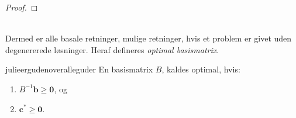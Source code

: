 {\begin{proof}
\end{proof}
\\
%
Dermed er alle basale retninger, mulige retninger, hvis et problem er givet uden degenererede løsninger. 
Heraf defineres \textit{optimal basismatrix}.}
%
\begin{defn}{}{julieergudenoveralleguder}
En basismatrix $B$, kaldes optimal, hvis:
%
\begin{enumerate}[label = (\alph*)]
\item $B^{-1} \mathbf{b} \geq \mathbf{0}$, og
\item $\mathbf{c}^* \geq \mathbf{0}$.
\end{enumerate}
%
\end{defn}
\noindent